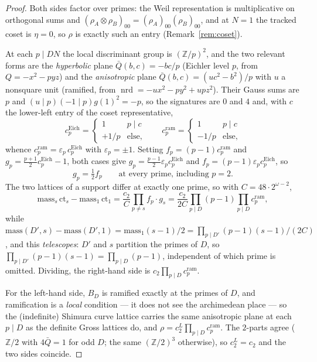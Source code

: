\documentclass[11pt,reqno]{amsart}
\theoremstyle{plain}
\theoremstyle{definition}
\DeclareMathOperator{\nrd}{nrd}
\newcommand{\Z}{\mathbb{Z}}
\begin{document}
\begin{proof}
Both sides factor over primes: the Weil representation is multiplicative on orthogonal
sums and $(\rho_A\otimes\rho_B)_{00}=(\rho_A)_{00}(\rho_B)_{00}$, and at $N=1$ the tracked
coset is $\eta=0$, so $\rho$ is exactly such an entry (Remark~\ref{rem:coset}).

At each $p\mid DN$ the local discriminant group is $(\Z/p)^2$, and the two relevant forms
are the \emph{hyperbolic} plane $\bar Q(b,c)=-bc/p$ (Eichler level $p$, from
$Q=-x^2-pyz$) and the \emph{anisotropic} plane $\bar Q(b,c)=(uc^2-b^2)/p$ with $u$ a
nonsquare unit (ramified, from $\nrd=-ux^2-py^2+upz^2$). Their Gauss sums are $p$ and
$(u\mid p)(-1\mid p)g(1)^2=-p$, so the signatures are $0$ and $4$ and, with $c$ the
lower-left entry of the coset representative,
\[
  c_p^{\mathrm{Eich}}=\begin{cases}1&p\mid c\\ +1/p&\text{else,}\end{cases}
  \qquad
  c_p^{\mathrm{ram}}=\begin{cases}1&p\mid c\\ -1/p&\text{else,}\end{cases}
\]
whence $c_p^{\mathrm{ram}}=\varepsilon_p\,c_p^{\mathrm{Eich}}$ with $\varepsilon_p=\pm1$.
Setting $f_p=(p-1)c_p^{\mathrm{ram}}$ and $g_p=\tfrac{p+1}2c_p^{\mathrm{Eich}}-1$, both
cases give $g_p=\tfrac{p-1}2\varepsilon_p c_p^{\mathrm{Eich}}$ and
$f_p=(p-1)\varepsilon_p c_p^{\mathrm{Eich}}$, so
\[
  g_p=\tfrac12 f_p \qquad\text{at every prime, including }p=2.
\]
The two lattices of a support differ at exactly one prime, so with
$C=48\cdot2^{\omega-2}$,
\[
  \mathrm{mass}_s\,\mathrm{ct}_s-\mathrm{mass}_1\,\mathrm{ct}_1
   =\frac{c_2}{C}\prod_{p\neq s}f_p\cdot g_s
   =\frac{c_2}{2C}\prod_{p\mid D}(p-1)\prod_{p\mid D}c_p^{\mathrm{ram}},
\]
while $\mathrm{mass}(D',s)-\mathrm{mass}(D',1)=\mathrm{mass}_1(s-1)/2
=\prod_{p\mid D'}(p-1)(s-1)/(2C)$, and this \emph{telescopes}: $D'$ and $s$ partition the
primes of $D$, so $\prod_{p\mid D'}(p-1)(s-1)=\prod_{p\mid D}(p-1)$, independent of which
prime is omitted. Dividing, the right-hand side is $c_2\prod_{p\mid D}c_p^{\mathrm{ram}}$.

For the left-hand side, $B_D$ is ramified exactly at the primes of $D$, and ramification
is a \emph{local} condition --- it does not see the archimedean place --- so the
(indefinite) Shimura curve lattice carries the same anisotropic plane at each $p\mid D$ as
the definite Gross lattices do, and $\rho=c_2^{L}\prod_{p\mid D}c_p^{\mathrm{ram}}$. The
$2$-parts agree ($\Z/2$ with $4\bar Q=1$ for odd $D$; the same $(\Z/2)^3$ otherwise), so
$c_2^L=c_2$ and the two sides coincide.
\end{proof}
\end{document}
